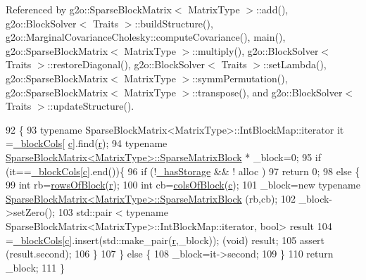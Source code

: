 Referenced by g2o\+::\+Sparse\+Block\+Matrix$<$ Matrix\+Type $>$\+::add(), g2o\+::\+Block\+Solver$<$ Traits $>$\+::build\+Structure(), g2o\+::\+Marginal\+Covariance\+Cholesky\+::compute\+Covariance(), main(), g2o\+::\+Sparse\+Block\+Matrix$<$ Matrix\+Type $>$\+::multiply(), g2o\+::\+Block\+Solver$<$ Traits $>$\+::restore\+Diagonal(), g2o\+::\+Block\+Solver$<$ Traits $>$\+::set\+Lambda(), g2o\+::\+Sparse\+Block\+Matrix$<$ Matrix\+Type $>$\+::symm\+Permutation(), g2o\+::\+Sparse\+Block\+Matrix$<$ Matrix\+Type $>$\+::transpose(), and g2o\+::\+Block\+Solver$<$ Traits $>$\+::update\+Structure().


\begin{DoxyCode}
92                                                                                                            
                   \{
93     \textcolor{keyword}{typename} SparseBlockMatrix<MatrixType>::IntBlockMap::iterator it =\hyperlink{classg2o_1_1SparseBlockMatrix_ae236d56a01ba4d292450a518621b41f8}{\_blockCols}[
      \hyperlink{sparse__block__matrix_8hpp_a4e1e0e72dd773439e333c84dd762a9c3}{c}].find(\hyperlink{sparse__block__matrix_8hpp_acab531abaa74a7e664e3986f2522b33a}{r});
94     \textcolor{keyword}{typename} \hyperlink{classg2o_1_1SparseBlockMatrix_ab2f7376cbf055803fda6527dcc43e3be}{SparseBlockMatrix<MatrixType>::SparseMatrixBlock}
      * \_block=0;
95     \textcolor{keywordflow}{if} (it==\hyperlink{classg2o_1_1SparseBlockMatrix_ae236d56a01ba4d292450a518621b41f8}{\_blockCols}[\hyperlink{sparse__block__matrix_8hpp_a4e1e0e72dd773439e333c84dd762a9c3}{c}].end())\{
96       \textcolor{keywordflow}{if} (!\hyperlink{classg2o_1_1SparseBlockMatrix_ae3f063a5efc2708b41806ac361fd3ca6}{\_hasStorage} && ! alloc )
97         \textcolor{keywordflow}{return} 0;
98       \textcolor{keywordflow}{else} \{
99         \textcolor{keywordtype}{int} rb=\hyperlink{classg2o_1_1SparseBlockMatrix_a2f1eceae58978d7ee263a80961006d22}{rowsOfBlock}(\hyperlink{sparse__block__matrix_8hpp_acab531abaa74a7e664e3986f2522b33a}{r});
100         \textcolor{keywordtype}{int} cb=\hyperlink{classg2o_1_1SparseBlockMatrix_adb88ef292aedf1468f57cf5dc751a8e2}{colsOfBlock}(\hyperlink{sparse__block__matrix_8hpp_a4e1e0e72dd773439e333c84dd762a9c3}{c});
101         \_block=\textcolor{keyword}{new} \textcolor{keyword}{typename} \hyperlink{classg2o_1_1SparseBlockMatrix_ab2f7376cbf055803fda6527dcc43e3be}{SparseBlockMatrix<MatrixType>::SparseMatrixBlock}
      (rb,cb);
102         \_block->setZero();
103         std::pair < typename SparseBlockMatrix<MatrixType>::IntBlockMap::iterator, \textcolor{keywordtype}{bool}> result
104           =\hyperlink{classg2o_1_1SparseBlockMatrix_ae236d56a01ba4d292450a518621b41f8}{\_blockCols}[\hyperlink{sparse__block__matrix_8hpp_a4e1e0e72dd773439e333c84dd762a9c3}{c}].insert(std::make\_pair(\hyperlink{sparse__block__matrix_8hpp_acab531abaa74a7e664e3986f2522b33a}{r},\_block)); (void) result;
105         assert (result.second);
106       \}
107     \} \textcolor{keywordflow}{else} \{
108       \_block=it->second;
109     \}
110     \textcolor{keywordflow}{return} \_block;
111   \}
\end{DoxyCode}
